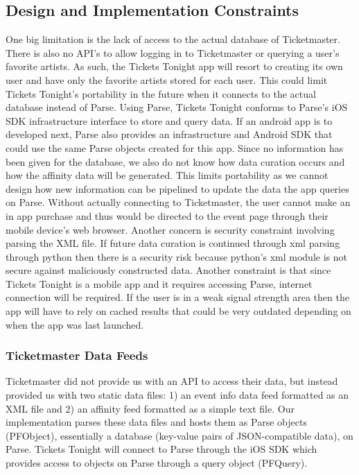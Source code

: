 		  \subsection{Design and Implementation Constraints}
		   One big limitation is the lack of access to the actual database of Ticketmaster. There is also no API’s 
		   to allow logging in to Ticketmaster or querying a user’s favorite artists. As such, the Tickets Tonight 
		   app will resort to creating its own user and have only the favorite artists stored for each user. This 
		   could limit Tickets Tonight’s portability in the future when it connects to the actual database instead 
		   of Parse. Using Parse, Tickets Tonight conforms to Parse’s iOS SDK infrastructure interface to store 
		   and query data. If an android app is to developed next, Parse also provides an infrastructure and 
		   Android SDK that could use the same Parse objects created for this app. Since no information has been 
		   given for the database, we also do not know how data curation occurs and how the affinity data will be 
		   generated. This limits portability as we cannot design how new information can be pipelined to update 
		   the data the app queries on Parse. Without actually connecting to Ticketmaster, the user cannot make 
		   an in app purchase and thus would be directed to the event page through their mobile device’s web 
		   browser. Another concern is security constraint involving parsing the XML file. If future data curation 
		   is continued through xml parsing through python then there is a security risk because python’s xml 
		   module is not secure against maliciously constructed data. Another constraint is that since Tickets 
		   Tonight is a mobile app and it requires accessing Parse, internet connection will be required. If the 
		   user is in a weak signal strength area then the app will have to rely on cached results that could be 
		   very outdated depending on when the app was last launched. 
		  
		    \subsubsection{Ticketmaster Data Feeds}
		     Ticketmaster did not provide us with an API to access their data, but instead provided us with two 
		     static data files: 1) an event info data feed formatted as an XML file and 2) an affinity feed formatted 
		     as a simple text file. Our implementation parses these data files and hosts them as Parse objects 
		     (PFObject), essentially a database  (key-value pairs of JSON-compatible data), on Parse. Tickets 
		     Tonight will connect to Parse through the iOS SDK which provides access to objects on Parse through 
		     a query object (PFQuery).
		     
